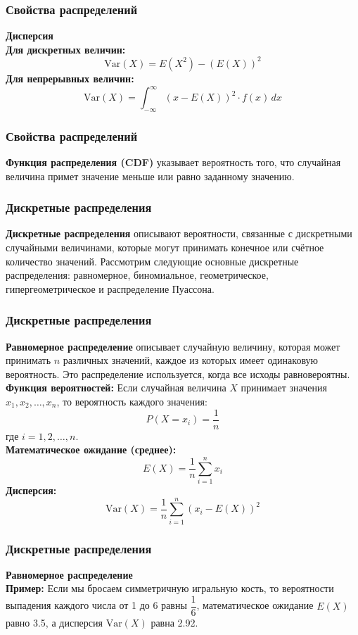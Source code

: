 \documentclass[aspectratio=169]{beamer}
\begin{document}
\begin{frame}
\frametitle{Свойства распределений}
{\bf Дисперсия}
\newline\\
{\bf Для дискретных величин:}
     \[
     \text{Var}(X) = E(X^2) - (E(X))^2
     \]
{\bf Для непрерывных величин:}
     \[
     \text{Var}(X) = \int_{-\infty}^{\infty} (x - E(X))^2 \cdot f(x) \, dx
     \]
\end{frame}

\begin{frame}
\frametitle{Свойства распределений}
{\bf Функция распределения (CDF)} указывает вероятность того, что случайная величина примет значение меньше или равно заданному значению.
\end{frame}

\begin{frame}
\frametitle{Дискретные распределения}
{\bf Дискретные распределения} описывают вероятности, связанные с дискретными случайными величинами, которые могут принимать конечное или счётное количество значений. Рассмотрим следующие основные дискретные распределения: равномерное, биномиальное, геометрическое, гипергеометрическое и распределение Пуассона.
\end{frame}

\begin{frame}
\frametitle{Дискретные распределения}
{\bf Равномерное распределение} описывает случайную величину, которая может принимать \( n \) различных значений, каждое из которых имеет одинаковую вероятность. Это распределение используется, когда все исходы равновероятны.\\
{\bf Функция вероятностей:} Если случайная величина \( X \) принимает значения \( x_1, x_2, \ldots, x_n \), то вероятность каждого значения:
  \[
  P(X = x_i) = \frac{1}{n}
  \]
где \( i = 1, 2, \ldots, n \).\\
{\bf Математическое ожидание (среднее):}
  \[
  E(X) = \frac{1}{n} \sum_{i=1}^{n} x_i
  \]
{\bf Дисперсия:}
  \[
  \text{Var}(X) = \frac{1}{n} \sum_{i=1}^{n} (x_i - E(X))^2
  \]
\end{frame}

\begin{frame}
\frametitle{Дискретные распределения}
{\bf Равномерное распределение}\\
{\bf Пример:} Если мы бросаем симметричную игральную кость, то вероятности выпадения каждого числа от 1 до 6 равны \( \dfrac{1}{6} \), математическое ожидание \( E(X) \) равно 3.5, а дисперсия \( \text{Var}(X) \) равна 2.92.
\end{frame}
\end{document}

